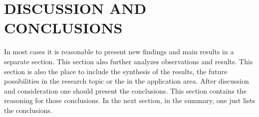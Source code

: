 \section{DISCUSSION AND CONCLUSIONS}\label{sec:conslusions}
\par In most cases it is reasonable to present new findings and main results in a separate section. This section also further analyzes observations and results. This section is also the place to include the synthesis of the results, the future possibilities in the research topic or the in the application area. After discussion and consideration one should present the conclusions. This section contains the reasoning for those conclusions. In the next section, in the summary, one just lists the conclusions.
 